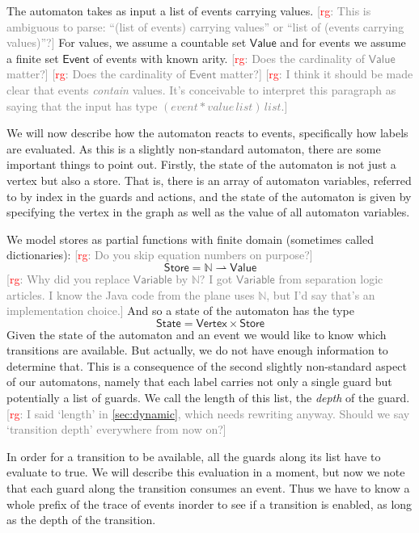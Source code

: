 \documentclass[preprint]{sigplanconf} %
\newcommand{\note}[2]{\textcolor{gray}{[\textcolor{red}{#1}: #2]}}
\newcommand{\rg}[1]{\note{rg}{#1}}
\newcommand{\N}{\ensuremath{\mathbb{N}}}
\newcommand{\pmap}{\rightharpoonup}
\newcommand{\set}[1]{\ensuremath{\mathsf{#1}}}
\theoremstyle{definition}
\theoremstyle{remark}
\begin{document}
The automaton takes as input a list of events carrying values.
\rg{This is ambiguous to parse: ``(list of events) carrying values'' or ``list of (events carrying values)''?}
For values, we assume a countable set \set{Value} and for events we assume
a finite set \set{Event} of events with known arity.
\rg{Does the cardinality of \set{Value} matter?}
\rg{Does the cardinality of \set{Event} matter?}
\rg{I think it should be made clear that events \emph{contain} values.
It's conceivable to interpret this paragraph as saying that the input has type $(\mathit{event}*\mathit{value}\,\mathit{list})\,\mathit{list}$.}

We will now describe how the automaton reacts to events, specifically
how labels are evaluated. As this is a slightly non-standard
automaton, there are some important things to point out. Firstly, the
state of the automaton is not just a vertex but also a store. 
That is, there is an array of automaton variables, referred to by
index in the guards and actions, and the state of the automaton is
given by specifying the vertex in the graph as well as the value of
all automaton variables.

We model stores as partial functions with finite domain (sometimes called dictionaries):
\rg{Do you skip equation numbers on purpose?}
\[
\set{Store} = \N \pmap \set{Value}
\]
\rg{Why did you replace \set{Variable} by $\N$?
I got \set{Variable} from separation logic articles.
I know the Java code from the plane uses $\N$, but I'd say that's an implementation choice.}
And so a state of the automaton has the type
\[
\set{State} = \set{Vertex}\times\set{Store}
\]
Given the state of the automaton and an event we would like to know
which transitions are available. But actually, we do not have enough
information to determine that. This is a consequence of the second
slightly non-standard aspect of our automatons, namely that each label
carries not only a single guard but potentially a list of guards.
We call the length of this list, the \emph{depth} of the guard.
\rg{I said `length' in \autoref{sec:dynamic}, which needs rewriting anyway.
Should we say `transition depth' everywhere from now on?}

In order for a transition to be available, all the guards along its
list have to evaluate to true. We will describe this evaluation in a
moment, but now we note that each guard along the transition consumes
an event. Thus we have to know a whole prefix of the trace of events
inorder to see if a transition is enabled, as long as the depth of the
transition.
\end{document}
